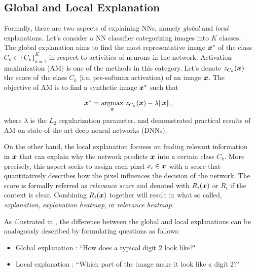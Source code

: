 \subsection{Global and Local Explanation}\label{sec:global_local_explanation}

Formally, there are two aspects of explaining NNs, namely \textit{global} and \textit{local} explanations. Let's consider a NN  classifier categorizing images into $K$ classes.  The global explanation aims to find the most representative image $\patvector{x}^*$ of the class $C_k \in \{C_k\}_{k=1}^K$ in respect to activities of neurons in the network. Activation maximization (AM) \citep{ ErhanUnderstandingRepresentationsLearned2010,SimonyanDeepConvolutionalNetworks2013} is one of the methods in this category. Let's denote $z_{C_k}(\boldsymbol{x})$  the score of the class $C_k$ (i.e. pre-softmax activation) of an image $\boldsymbol{x}$. The objective of AM is to find a synthetic image $\boldsymbol{x}^*$ such that  

\begin{align*}
\patvector{x}^*  = \patarg{max}{\patvector{x}} z_{C_k}(\x) - \lambda \|\x\|,
\end{align*}
where $\lambda$ is the $L_2$ regularization parameter. \citet{SimonyanDeepConvolutionalNetworks2013} and \citet{NguyenSynthesizingpreferredinputs2016a} demonstrated practical results of AM on state-of-the-art deep neural networks (DNNs).

On the other hand, the local explanation focuses on finding relevant information in $\patvector{x}$ that can explain why the network predicts $\boldsymbol{x}$ into a certain class $C_k$.  More precisely, this aspect seeks to assign each pixel $x_i \in \patvector{x}$ with a score that quantitatively describes how the pixel influences the decision of the network. The score is formally referred as \textit{relevance score} and denoted with $R_i(\boldsymbol{x})$ or $R_i$ if the context is clear. Combining $R_i(\boldsymbol{x})$ together will result in what so called, \textit{explanation}, \textit{explanation heatmap}, or \textit{relevance heatmap}.

As illustrated in \addfigure{\ref{fig:comparision_between_global_and_local_analysis}}, the difference between the global and local explanations can be analogously described by formulating questions as follows:
\begin{itemize}
	\item Global explanation : ``How does a typical digit 2 look like?"
    \item Local explanation : ``Which part of the image make it look like a digit 2?" 
\end{itemize}

